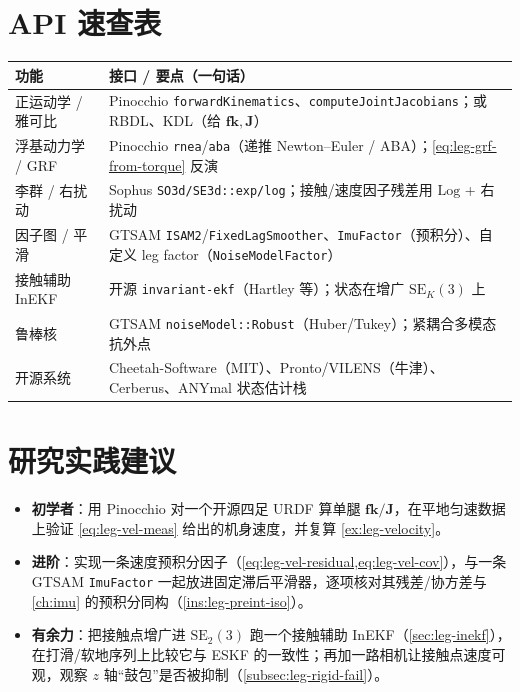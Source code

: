\section*{API 速查表}
\begin{table}[H]\centering\small
\begin{tabular}{p{} p{}}
\toprule
功能 & 接口 / 要点（一句话） \\
\midrule
正运动学 / 雅可比 & Pinocchio \texttt{forwardKinematics}、\texttt{computeJointJacobians}；或 RBDL、KDL（给 $\mathbf{fk},\mathbf{J}$） \\
浮基动力学 / GRF & Pinocchio \texttt{rnea}/\allowbreak\texttt{aba}（递推 Newton--Euler / ABA）；\cref{eq:leg-grf-from-torque} 反演 \\
李群 / 右扰动 & Sophus \texttt{SO3d/\allowbreak SE3d::exp/\allowbreak log}；接触/速度因子残差用 $\mathrm{Log}$ + 右扰动 \\
因子图 / 平滑 & GTSAM \texttt{ISAM2}/\allowbreak\texttt{FixedLagSmoother}、\texttt{ImuFactor}（预积分）、自定义 leg factor（\texttt{NoiseModelFactor}） \\
接触辅助 InEKF & 开源 \texttt{invariant-ekf}（Hartley 等）；状态在增广 $\mathrm{SE}_K(3)$ 上 \\
鲁棒核 & GTSAM \texttt{noiseModel::Robust}（Huber/Tukey）；紧耦合多模态抗外点 \\
开源系统 & Cheetah-Software（MIT）、Pronto/VILENS（牛津）、Cerberus、ANYmal 状态估计栈 \\
\bottomrule
\end{tabular}
\end{table}

\section*{研究实践建议}
\begin{itemize}
  \item \textbf{初学者}：用 Pinocchio 对一个开源四足 URDF 算单腿 $\mathbf{fk}/\mathbf{J}$，在平地匀速数据上验证 \cref{eq:leg-vel-meas} 给出的机身速度，并复算 \cref{ex:leg-velocity}。
  \item \textbf{进阶}：实现一条速度预积分因子（\cref{eq:leg-vel-residual,eq:leg-vel-cov}），与一条 GTSAM \texttt{ImuFactor} 一起放进固定滞后平滑器，逐项核对其残差/协方差与 \cref{ch:imu} 的预积分同构（\cref{ins:leg-preint-iso}）。
  \item \textbf{有余力}：把接触点增广进 $\mathrm{SE}_2(3)$ 跑一个接触辅助 InEKF（\cref{sec:leg-inekf}），在打滑/软地序列上比较它与 ESKF 的一致性；再加一路相机让接触点速度可观，观察 $z$ 轴“鼓包”是否被抑制（\cref{subsec:leg-rigid-fail}）。
\end{itemize}

